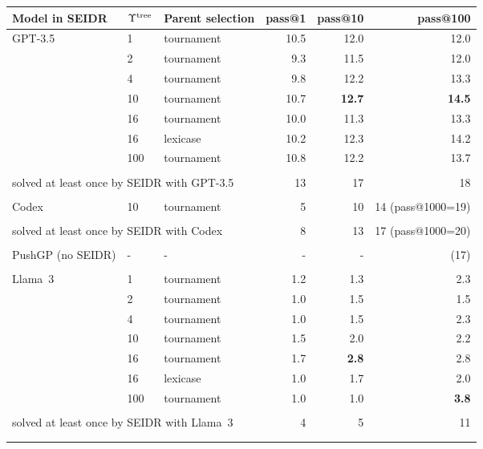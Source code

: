 \begin{tabular}{lllrrr}
\toprule
Model in SEIDR & $\Upsilon^\text{tree}$ & Parent selection &  pass@1 &  pass@10 &  pass@100 \\
\midrule
% 
GPT-3.5 & 1   &         tournament &    10.5 &     12.0 &      12.0 \\
& 2   &         tournament &     9.3 &     11.5 &      12.0 \\
& 4   &         tournament &     9.8 &     12.2 &      13.3 \\
& 10  &         tournament &    10.7 &     \textbf{12.7} &      \textbf{14.5} \\
& 16  &         tournament &    10.0 &     11.3 &      13.3 \\
& 16  &           lexicase &    10.2 &     12.3 &      14.2 \\
& 100 &         tournament &    10.8 &     12.2 &      13.7 \\
\cline{2-6}\\[-8pt]
\multicolumn{3}{l}{solved at least once by SEIDR with GPT-3.5} &  13 &       17 &       18 \\[1pt]
\cline{1-6}\\[-8pt]
Codex  & 10 & tournament &      5 &       10 &        14 (pass@1000=19) \\[1pt]
\cline{2-6}\\[-8pt]
\multicolumn{3}{l}{solved at least once by SEIDR with Codex}   & 8 &       13 &        17 (pass@1000=20) \\[3pt]
\cline{1-6}\\[-8pt]
PushGP (no SEIDR)   &    -            &       - &        - &       - &  (17)\\[1pt]
\cline{1-6}\\[-8pt]
% 
Llama~3 & 1   &         tournament &     1.2 &      1.3 &       2.3 \\
& 2   &         tournament &     1.0 &      1.5 &       1.5 \\
& 4   &         tournament &     1.0 &      1.5 &       2.3 \\
& 10  &         tournament &     1.5 &      2.0 &       2.2 \\
& 16  &         tournament &     1.7 &      \textbf{2.8} &       2.8 \\
& 16  &           lexicase &     1.0 &      1.7 &       2.0 \\
& 100 &         tournament &     1.0 &      1.0 &       \textbf{3.8} \\[1pt]
\cline{2-6}\\[-8pt]
\multicolumn{3}{l}{solved at least once by SEIDR with Llama~3} &   4 &        5 &       11 \\
  \bottomrule
\\ %
\\ %
\end{tabular}